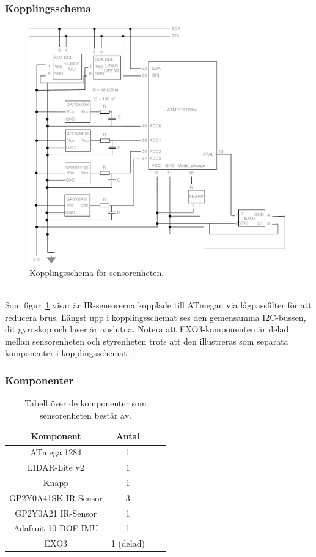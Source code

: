 \documentclass{article}
\begin{document}
\subsubsection{Kopplingsschema}
\begin{figure}[H]
\centering
\includegraphics[scale=0.45]{Sensorenhet_kopplingsschema}
\caption{Kopplingsschema för sensorenheten.}
\label{fig:sensorenhet_kopplingsschema}
\end{figure}
\ \\
Som figur~\ref{fig:sensorenhet_kopplingsschema} visar är IR-sensorerna kopplade till ATmegan via lågpassfilter för att reducera brus. Längst upp i kopplingsschemat ses den gemensamma I2C-bussen, dit gyroskop och laser är anslutna. Notera att EXO3-komponenten är delad mellan sensorenheten och styrenheten trots att den illustreras som separata komponenter i kopplingsschemat.

\subsubsection{Komponenter}

\begin{table}[H]
\centering
\caption{ Tabell över de komponenter som sensorenheten består av. }
\begin{tabular}{ | c | c | c | c |}
\hline
\textbf{Komponent} & \textbf{Antal} \\
\hline
ATmega 1284 & 1 \\
\hline
LIDAR-Lite v2 & 1 \\
\hline
Knapp & 1 \\
\hline
GP2Y0A41SK IR-Sensor & 3 \\
\hline
GP2Y0A21 IR-Sensor & 1 \\
\hline
Adafruit 10-DOF IMU & 1 \\
\hline
EXO3 & 1 (delad) \\
\hline
\end{tabular}
\end{table}
\end{document}
